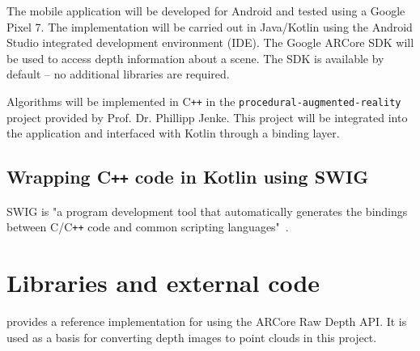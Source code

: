 The mobile application will be developed for Android and tested using a Google Pixel 7.
The implementation will be carried out in Java/Kotlin using the Android Studio integrated development environment (IDE).
The Google ARCore SDK will be used to access depth information about a scene.
The SDK is available by default -- no additional libraries are required.

Algorithms will be implemented in C\texttt{++} in the \texttt{procedural-augmented-reality} project provided by Prof. Dr. Phillipp Jenke.
This project will be integrated into the application and interfaced with Kotlin through a binding layer.

\subsection{Wrapping C\texttt{++} code in Kotlin using SWIG}
SWIG is "a program development tool that automatically generates the bindings between C/C\texttt{++}
code and common scripting languages"~\parencite{beazley_swig_1996}.


\section{Libraries and external code}
\parencite{google_llc_codelab_raw_depth} provides a reference implementation for using the ARCore Raw Depth API.
It is used as a basis for converting depth images to point clouds in this project.



